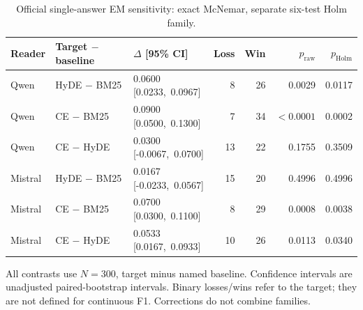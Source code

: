 \begin{table}[htbp]
\centering\footnotesize
\setlength{\tabcolsep}{3pt}
\renewcommand{\arraystretch}{1.08}
\caption{Official single-answer EM sensitivity: exact McNemar, separate six-test Holm family.}
\label{tab:followup_holdout_official_em}
\begin{tabularx}{\textwidth}{l l >{\centering\arraybackslash}X r r r r}
\toprule
Reader & Target $-$ baseline & $\Delta$ [95\% CI] & Loss & Win & $p_{\mathrm{raw}}$ & $p_{\mathrm{Holm}}$ \\
\midrule
Qwen & HyDE $-$ BM25 & \shortstack{0.0600\\\mbox{[0.0233, 0.0967]}} & 8 & 26 & 0.0029 & 0.0117 \\
Qwen & CE $-$ BM25 & \shortstack{0.0900\\\mbox{[0.0500, 0.1300]}} & 7 & 34 & $<0.0001$ & 0.0002 \\
Qwen & CE $-$ HyDE & \shortstack{0.0300\\\mbox{[-0.0067, 0.0700]}} & 13 & 22 & 0.1755 & 0.3509 \\
Mistral & HyDE $-$ BM25 & \shortstack{0.0167\\\mbox{[-0.0233, 0.0567]}} & 15 & 20 & 0.4996 & 0.4996 \\
Mistral & CE $-$ BM25 & \shortstack{0.0700\\\mbox{[0.0300, 0.1100]}} & 8 & 29 & 0.0008 & 0.0038 \\
Mistral & CE $-$ HyDE & \shortstack{0.0533\\\mbox{[0.0167, 0.0933]}} & 10 & 26 & 0.0113 & 0.0340 \\
\bottomrule
\end{tabularx}
\begin{tablenotes}\footnotesize
\item All contrasts use $N=300$, target minus named baseline. Confidence intervals are unadjusted paired-bootstrap intervals. Binary losses/wins refer to the target; they are not defined for continuous F1. Corrections do not combine families.
\end{tablenotes}
\end{table}

